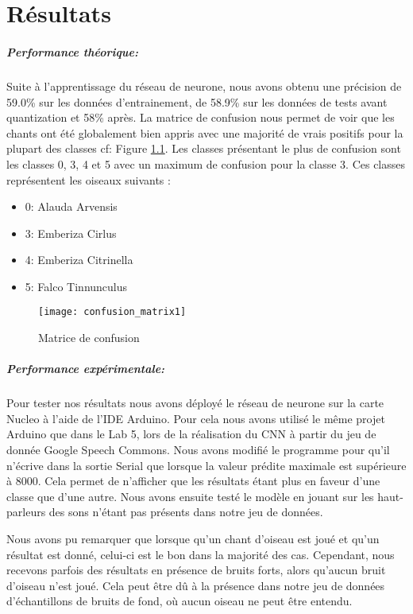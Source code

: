 \chapter{Résultats}


\paragraph{Performance théorique:} Suite à l'apprentissage du réseau de neurone, nous avons obtenu une précision de 59.0\% sur les données d'entrainement,
de 58.9\% sur les données de tests avant quantization et 58\% après.
La matrice de confusion nous permet de voir que les chants ont été globalement 
bien appris avec une majorité de vrais positifs pour la plupart des classes cf: Figure \ref{graph:confusion_matrix1}.
Les classes présentant le plus de confusion sont les classes 0, 3, 4 et 5 avec un maximum de confusion pour la classe 3.
Ces classes représentent les oiseaux suivants :

\begin{itemize}
  \item 0: Alauda Arvensis
  \item 3: Emberiza Cirlus
  \item 4: Emberiza Citrinella
  \item 5: Falco Tinnunculus
\end{itemize}

\begin{figure}[!ht]
  \texttt{[image: confusion\_matrix1]}
  \centering
  \caption{Matrice de confusion}
  \label{graph:confusion_matrix1}
\end{figure}

\paragraph{Performance expérimentale:} Pour tester nos résultats nous avons déployé le réseau de neurone sur la carte Nucleo à l'aide 
de l'IDE Arduino. Pour cela nous avons utilisé le même projet Arduino que dans le Lab 5, lors de la réalisation du CNN à partir du
jeu de donnée Google Speech Commons. Nous avons modifié le programme pour qu'il n'écrive dans la sortie Serial que lorsque la valeur prédite maximale
est supérieure à 8000. Cela permet de n'afficher que les résultats étant plus en faveur d'une classe que d'une autre.
Nous avons ensuite testé le modèle en jouant sur les haut-parleurs des sons n'étant pas présents dans notre jeu de données.

Nous avons pu remarquer que lorsque qu'un chant d'oiseau est joué et qu'un résultat est donné, celui-ci est le bon dans la majorité des cas.
Cependant, nous recevons parfois des résultats en présence de bruits forts, alors qu'aucun bruit d'oiseau n'est joué. 
Cela peut être dû à la présence dans notre jeu de données d'échantillons de bruits de fond, où aucun oiseau ne peut être entendu.


